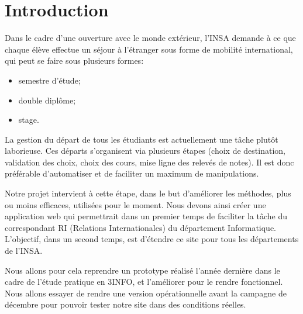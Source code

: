 \chapter*{Introduction}
Dans le cadre d'une ouverture avec le monde extérieur, l'INSA demande à ce que chaque élève effectue un séjour à l'étranger sous forme de mobilité international, qui peut se faire sous plusieurs formes:
\begin{itemize}
\item semestre d'étude;
\item double diplôme;
\item stage.
\end{itemize}

La gestion du départ de tous les étudiants est actuellement une tâche plutôt laborieuse.
Ces départs s'organisent via plusieurs étapes (choix de destination, validation des choix, choix des cours, mise ligne des relevés de notes). Il est donc préférable d'automatiser et de faciliter un maximum de manipulations.

Notre projet intervient à cette étape, dans le but d'améliorer les méthodes, plus ou moins efficaces, utilisées pour le moment. Nous devons ainsi créer une application web qui permettrait dans un premier temps de faciliter la tâche du correspondant RI (Relations Internationales) du département Informatique. L'objectif, dans un second temps, est d'étendre ce site pour tous les départements de l'INSA.

Nous allons pour cela reprendre un prototype réalisé l'année dernière dans le cadre de l'étude pratique en 3INFO, et l'améliorer pour le rendre fonctionnel.
Nous allons essayer de rendre une version opérationnelle avant la campagne  de décembre pour pouvoir tester notre site dans des conditions réelles.
